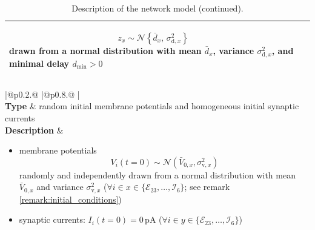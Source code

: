 \documentclass[10pt,a4paper,twoside,american]{article}
\theoremstyle{definitionstyle}
\begin{document}
\begin{table}
\begin{tabular}{
  |@{\hspace*{\marg}}p{}@{\hspace*{\marg}}
  |@{\hspace*{\marg}}p{}@{\hspace*{\marg}}
  |}
\begin{itemize}
\begin{equation*}
      z_{x} \sim\mathcal{N}\left\{\bar{d}_{x},\,\sigma_{\text{d},x}^2\right\}
  \end{equation*}
  drawn from a normal distribution with mean $\bar{d}_{x}$, variance $\sigma_{\text{d},x}^2$, and minimal delay $d_\text{min} > 0$
  \end{itemize}\\
  \hline
\end{tabular}
\begin{tabular}{
  |@{\hspace*{\marg}}p{}@{\hspace*{\marg}}
  |@{\hspace*{\marg}}p{}@{\hspace*{\marg}}
  |}
  \hline
  \\
\hline
\textbf{Type} & random initial membrane potentials and homogeneous initial synaptic currents\\
\hline
  \textbf{Description} &
  \begin{itemize}
  \item membrane potentials
    \begin{equation*}
      V_i(t=0)\sim\mathcal{N}(\bar{V}_{0,x},\sigma_{\text{v},x}^2)
    \end{equation*}
  randomly and independently drawn from a normal distribution with mean $\bar{V}_{0,x}$ and variance $\sigma^2_{\text{v},x}$ ($\forall i \in x\in\{\mathcal{E}_{23},\ldots,\mathcal{I}_{6}\}$; see remark \ref{remark:initial_conditions})
  \item synaptic currents: $I_{i}(t=0)=0\,\text{pA}$ ($\forall i \in y\in\{\mathcal{E}_{23},\ldots,\mathcal{I}_{6}\}$)
  \end{itemize}\\
  \hline
\end{tabular}
\caption{Description of the network model (continued).}
\end{table}
\clearpage
\end{document}
